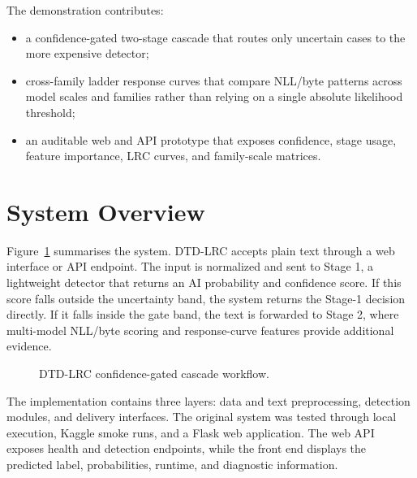 \documentclass[11pt]{article}
\begin{document}
The demonstration contributes:
\begin{itemize}
    \item a confidence-gated two-stage cascade that routes only uncertain cases to the more expensive detector;
    \item cross-family ladder response curves that compare NLL/byte patterns across model scales and families rather than relying on a single absolute likelihood threshold;
    \item an auditable web and API prototype that exposes confidence, stage usage, feature importance, LRC curves, and family-scale matrices.
\end{itemize}

\section{System Overview}

Figure~\ref{fig:workflow} summarises the system. DTD-LRC accepts plain text through a web interface or API endpoint. The input is normalized and sent to Stage 1, a lightweight detector that returns an AI probability and confidence score. If this score falls outside the uncertainty band, the system returns the Stage-1 decision directly. If it falls inside the gate band, the text is forwarded to Stage 2, where multi-model NLL/byte scoring and response-curve features provide additional evidence.

\begin{figure}[t]
\centering
{}
\caption{DTD-LRC confidence-gated cascade workflow.}
\label{fig:workflow}
\end{figure}

The implementation contains three layers: data and text preprocessing, detection modules, and delivery interfaces. The original system was tested through local execution, Kaggle smoke runs, and a Flask web application. The web API exposes health and detection endpoints, while the front end displays the predicted label, probabilities, runtime, and diagnostic information.
\end{document}
